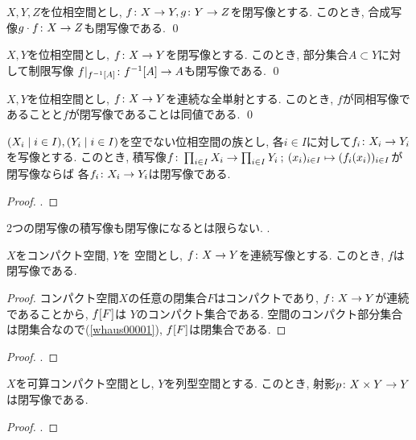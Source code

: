 \documentclass[uplatex, dvipdfmx, a4paper, 12pt, class=jsbook, crop=false]{standalone}
\begin{document}
\begin{proposition}
	$ X, Y, Z $を位相空間とし, $ f\colon X\to Y, g\colon Y\to Z $を閉写像とする.
	このとき, 合成写像$ g \cdot f\colon X\to Z $も閉写像である.
	\qed
\end{proposition}

\begin{proposition}
	$ X, Y $を位相空間とし, $ f\colon X\to Y $を閉写像とする.
	このとき, 部分集合$ A \subset Y $に対して制限写像
	$ \morph{f|_{\mapinvset{f}{A}}}{\mapinvset{f}{A}}{A} $も閉写像である.
	\qed
\end{proposition}

\begin{proposition}
	$ X, Y $を位相空間とし, $ f\colon X\to Y $を連続な全単射とする.
	このとき, $ f $が同相写像であることと$ f $が閉写像であることは同値である.
	\qed
\end{proposition}

\begin{proposition}
	$ \setfamily{X_i}{i \in I}, \setfamily{Y_i}{i \in I} $を空でない位相空間の族とし,
	各$ i \in I $に対して$ f_i\colon X_i\to Y_i $を写像とする.
	このとき, 積写像$ \morph{f}{\prod_{i \in I} X_i}{\prod_{i \in I} Y_i}
	\semicolon (x_i)_{i \in I} \mapsto (\mappt{f_i}{x_i})_{i \in I} $が閉写像ならば
	各$ f_i\colon X_i\to Y_i $は閉写像である.
\end{proposition}

\begin{proof}
	\WIP.
\end{proof}

\begin{example}
	2つの閉写像の積写像も閉写像になるとは限らない.
	\WIP.
\end{example}

\begin{proposition}
	$ X $をコンパクト空間, $ Y $を \Hausdorff 空間とし, $ f\colon X\to Y $を連続写像とする.
	このとき, $ f $は閉写像である.
\end{proposition}

\begin{proof}
	コンパクト空間$ X $の任意の閉集合$ F $はコンパクトであり,
	$ f\colon X\to Y $が連続であることから, $ \mapset{f}{F} $は
	$ Y $のコンパクト集合である.
	\Hausdorff 空間のコンパクト部分集合は閉集合なので(\cref{whaus00001}),
	$ \mapset{f}{F} $は閉集合である.
\end{proof}

\begin{proposition}[{\cite[Theorem~3.3.22]{Engelking1989GT}}]
	$ X $を位相空間, $ Y $をk空間とし, $ \morph{f}{X}{Y} $を連続写像とする.
	このとき, $ f $が閉写像であるための必要十分条件は, $ Y $の任意のコンパクト部分集合$ F $に対して
	$ \morph{f|_{\mapinvset{f}{F}}{\mapinvset{f}{F}}{F}
	\semicolon x \mapsto \mappt{f}{x} $が閉写像になることである.
\end{proposition}

\begin{proof}
	\WIP.
\end{proof}

\begin{proposition}
	$ X $を可算コンパクト空間とし, $ Y $を列型空間とする. このとき, 射影$ p\colon X \times Y\to Y $は閉写像である.
\end{proposition}

\begin{proof}
	\WIP.
\end{proof}
\end{document}
